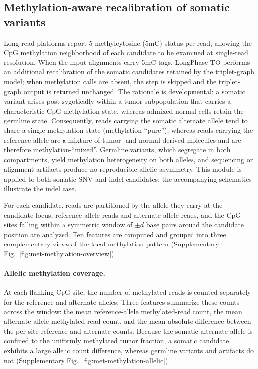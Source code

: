 \documentclass[pdflatex,sn-nature]{sn-jnl}
\begin{document}
\subsection{Methylation-aware recalibration of somatic variants}
\label{app:methylation-recalibration}

Long-read platforms report 5-methylcytosine (5mC) status per read, allowing the CpG methylation neighborhood of each candidate to be examined at single-read resolution. When the input alignments carry 5mC tags, LongPhase-TO performs an additional recalibration of the somatic candidates retained by the triplet-graph model; when methylation calls are absent, the step is skipped and the triplet-graph output is returned unchanged. The rationale is developmental: a somatic variant arises post-zygotically within a tumor subpopulation that carries a characteristic CpG methylation state, whereas admixed normal cells retain the germline state. Consequently, reads carrying the somatic alternate allele tend to share a single methylation state (methylation-``pure''), whereas reads carrying the reference allele are a mixture of tumor- and normal-derived molecules and are therefore methylation-``mixed''. Germline variants, which segregate in both compartments, yield methylation heterogeneity on both alleles, and sequencing or alignment artifacts produce no reproducible allelic asymmetry. This module is applied to both somatic SNV and indel candidates; the accompanying schematics illustrate the indel case.

For each candidate, reads are partitioned by the allele they carry at the candidate locus, reference-allele reads and alternate-allele reads, and the CpG sites falling within a symmetric window of \(\pm d\) base pairs around the candidate position are analyzed. Ten features are computed and grouped into three complementary views of the local methylation pattern (Supplementary Fig.~\ref{fig:met-methylation-overview}).

\paragraph{Allelic methylation coverage.} At each flanking CpG site, the number of methylated reads is counted separately for the reference and alternate alleles. Three features summarize these counts across the window: the mean reference-allele methylated-read count, the mean alternate-allele methylated-read count, and the mean absolute difference between the per-site reference and alternate counts. Because the somatic alternate allele is confined to the uniformly methylated tumor fraction, a somatic candidate exhibits a large allelic count difference, whereas germline variants and artifacts do not (Supplementary Fig.~\ref{fig:met-methylation-allelic}).
\end{document}
